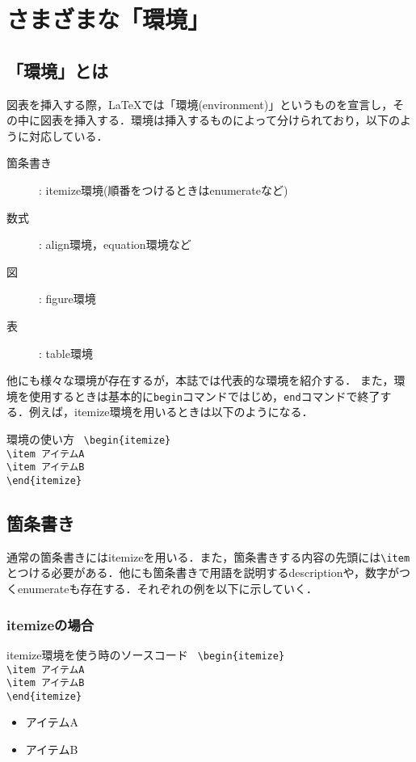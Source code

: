 \section{さまざまな「環境」}
\subsection{「環境」とは}
図表を挿入する際，\LaTeX では「環境(environment)」というものを宣言し，その中に図表を挿入する．環境は挿入するものによって分けられており，以下のように対応している．
\begin{description}
  \item[箇条書き]: itemize環境(順番をつけるときはenumerateなど)
  \item[数式]: align環境，equation環境など
  \item[図]: figure環境
  \item[表]: table環境
\end{description}
他にも様々な環境が存在するが，本誌では代表的な環境を紹介する．
また，環境を使用するときは基本的に\texttt{begin}コマンドではじめ，\texttt{end}コマンドで終了する．例えば，itemize環境を用いるときは以下のようになる．
\begin{itembox}[c]{環境の使い方}
  \texttt{
    \hspace{-0.5\zw}\textbackslash begin\{itemize\}\\
    \hspace{2\zw}\textbackslash item アイテムA\\
    \hspace{2\zw}\textbackslash item アイテムB\\
    \textbackslash end\{itemize\}
  }
\end{itembox}
\subsection{箇条書き}
通常の箇条書きにはitemizeを用いる．また，箇条書きする内容の先頭には\texttt{\textbackslash item}とつける必要がある．他にも箇条書きで用語を説明するdescriptionや，数字がつくenumerateも存在する．それぞれの例を以下に示していく．
\newpage
\subsubsection{itemizeの場合}
\begin{itembox}[c]{itemize環境を使う時のソースコード}
  \texttt{
    \hspace{-0.5\zw}\textbackslash begin\{itemize\}\\
    \hspace{2\zw}\textbackslash item アイテムA\\
    \hspace{2\zw}\textbackslash item アイテムB\\
    \textbackslash end\{itemize\}
  }
\end{itembox}
\begin{itemize}
  \item アイテムA
  \item アイテムB
\end{itemize}
